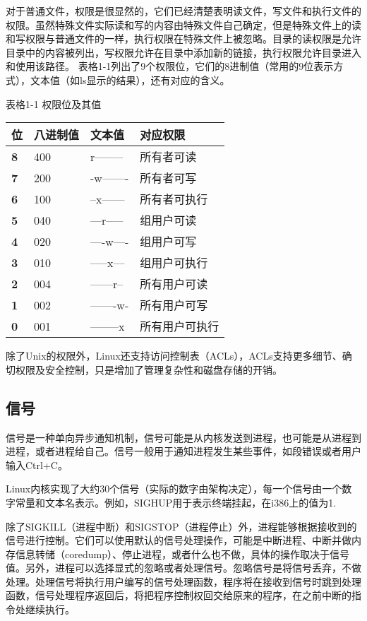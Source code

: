 对于普通文件，权限是很显然的，它们已经清楚表明读文件，写文件和执行文件的权限。虽然特殊文件实际读和写的内容由特殊文件自己确定，但是特殊文件上的读和写权限与普通文件的一样，执行权限在特殊文件上被忽略。目录的读权限是允许目录中的内容被列出，写权限允许在目录中添加新的链接，执行权限允许目录进入和使用该路径。 表格1-1列出了9个权限位，它们的8进制值（常用的9位表示方式），文本值（如ls显示的结果），还有对应的含义。
\begin{flushleft}
表格1-1 权限位及其值
\end{flushleft}
\begin{flushleft}
\begin{tabular}{p{2cm}p{2.8cm}p{2.8cm}p{3.0cm}}\toprule
\rowcolor[gray]{.9}
 \textbf{位} & \textbf{八进制值} & \textbf{文本值} & \textbf{对应权限}\\ \midrule
 \textbf 8 & 400 & r-------- & 所有者可读 \\ 
 \textbf 7 & 200 & -w------- & 所有者可写 \\ 
 \textbf 6 & 100 & --x------ & 所有者可执行 \\ 
 \textbf 5 & 040 & ---r----- & 组用户可读 \\ 
 \textbf 4 & 020 & ----w---- & 组用户可写 \\ 
 \textbf 3 & 010 & -----x--- & 组用户可执行 \\ 
 \textbf 2 & 004 & ------r-- & 所有用户可读 \\ 
 \textbf 1 & 002 & -------w- & 所有用户可写 \\ 
 \textbf 0 & 001 & --------x & 所有用户可执行 \\ 
 \end{tabular}
 \end{flushleft}
除了Unix的权限外，Linux还支持访问控制表（ACLs），ACLs支持更多细节、确切权限及安全控制，只是增加了管理复杂性和磁盘存储的开销。

\subsection{信号}

信号是一种单向异步通知机制，信号可能是从内核发送到进程，也可能是从进程到进程，或者进程给自己。信号一般用于通知进程发生某些事件，如段错误或者用户输入Ctrl+C。

Linux内核实现了大约30个信号（实际的数字由架构决定），每一个信号由一个数字常量和文本名表示。例如，SIGHUP用于表示终端挂起，在i386上的值为1.

除了SIGKILL（进程中断）和SIGSTOP（进程停止）外，进程能够根据接收到的信号进行控制。它们可以使用默认的信号处理操作，可能是中断进程、中断并做内存信息转储（coredump）、停止进程，或者什么也不做，具体的操作取决于信号值。另外，进程可以选择显式的忽略或者处理信号。忽略信号是将信号丢弃，不做处理。处理信号将执行用户编写的信号处理函数，程序将在接收到信号时跳到处理函数，信号处理程序返回后，将把程序控制权回交给原来的程序，在之前中断的指令处继续执行。

